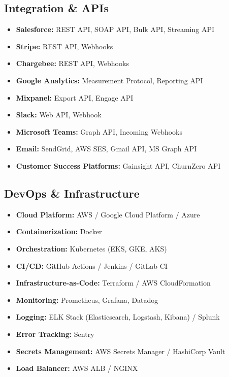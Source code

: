 \documentclass[12pt,a4paper]{article}
\begin{document}
\subsection{Integration \& APIs}
\begin{itemize}
    \item \textbf{Salesforce:} REST API, SOAP API, Bulk API, Streaming API
    \item \textbf{Stripe:} REST API, Webhooks
    \item \textbf{Chargebee:} REST API, Webhooks
    \item \textbf{Google Analytics:} Measurement Protocol, Reporting API
    \item \textbf{Mixpanel:} Export API, Engage API
    \item \textbf{Slack:} Web API, Webhook
    \item \textbf{Microsoft Teams:} Graph API, Incoming Webhooks
    \item \textbf{Email:} SendGrid, AWS SES, Gmail API, MS Graph API
    \item \textbf{Customer Success Platforms:} Gainsight API, ChurnZero API
\end{itemize}

\subsection{DevOps \& Infrastructure}
\begin{itemize}
    \item \textbf{Cloud Platform:} AWS / Google Cloud Platform / Azure
    \item \textbf{Containerization:} Docker
    \item \textbf{Orchestration:} Kubernetes (EKS, GKE, AKS)
    \item \textbf{CI/CD:} GitHub Actions / Jenkins / GitLab CI
    \item \textbf{Infrastructure-as-Code:} Terraform / AWS CloudFormation
    \item \textbf{Monitoring:} Prometheus, Grafana, Datadog
    \item \textbf{Logging:} ELK Stack (Elasticsearch, Logstash, Kibana) / Splunk
    \item \textbf{Error Tracking:} Sentry
    \item \textbf{Secrets Management:} AWS Secrets Manager / HashiCorp Vault
    \item \textbf{Load Balancer:} AWS ALB / NGINX
\end{itemize}
\end{document}
